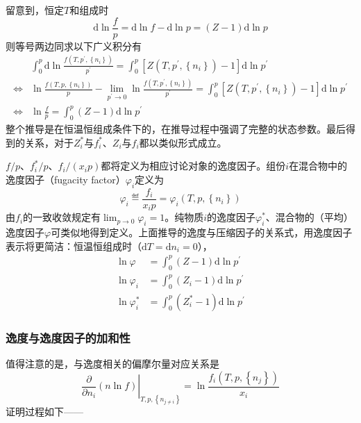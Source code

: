 \documentclass[main.tex]{subfiles}
\begin{document}
留意到，恒定$T$和组成时
\[\mathrm{d}\ln\frac{f}{p}=\mathrm{d}\ln f-\mathrm{d}\ln p=\left(Z-1\right)\mathrm{d}\ln p\]
则等号两边同求以下广义积分有
\begin{align*}
                    & \int_0^p\mathrm{d}\ln\frac{f\left(T,p^\prime,\left\{n_i\right\}\right)}{p^\prime}=\int_0^p\left[Z\left(T,p^\prime,\left\{n_i\right\}\right)-1\right]\mathrm{d}\ln p^\prime                                                     \\
    \Leftrightarrow & \ln\frac{f\left(T,p,\left\{n_i\right\}\right)}{p}-\lim_{p^\prime\to 0}\ln\frac{f\left(T,p^\prime,\left\{n_i\right\}\right)}{p^\prime}=\int_0^p\left[Z\left(T,p^\prime,\left\{n_i\right\}\right)-1\right]\mathrm{d}\ln p^\prime \\
    \Leftrightarrow & \ln\frac{f}{p}=\int_0^p\left(Z-1\right)\mathrm{d}\ln p^\prime
\end{align*}
整个推导是在恒温恒组成条件下的，在推导过程中强调了完整的状态参数。最后得到的关系，对于$Z_i^*$与$f_i^*$、$Z_i$与$f_i$都以类似形式成立。

$f/p$、$f_i^*/p$、$f_i/\left(x_ip\right)$都将定义为相应讨论对象的逸度因子。组份$i$在混合物中的逸度因子（fugacity factor）$\varphi_i$定义为
\begin{equation}\label{eq:II.4_def_fugacity_factor_i}
    \varphi_i\eqdef\frac{f_i}{x_ip}=\varphi_i\left(T,p,\left\{n_i\right\}\right)
\end{equation}
由$f_i$的一致收敛规定有$\lim_{p\to 0}\varphi_i=1$。纯物质$i$的逸度因子$\varphi_i^*$、混合物的（平均）逸度因子$\varphi$可类似地得到定义。上面推导的逸度与压缩因子的关系式，用逸度因子表示将更简洁：恒温恒组成时（$\mathrm{d}T=\mathrm{d}n_i=0$），
\begin{align*}
    \ln\varphi     & =\int_0^p\left(Z-1\right)\mathrm{d}\ln p^\prime     \\
    \ln\varphi_i   & =\int_0^p\left(Z_i-1\right)\mathrm{d}\ln p^\prime   \\
    \ln\varphi^*_i & =\int_0^p\left(Z_i^*-1\right)\mathrm{d}\ln p^\prime
\end{align*}

\subsubsection{逸度与逸度因子的加和性}
值得注意的是，与逸度相关的偏摩尔量对应关系是
\[\left.\frac{\partial}{\partial n_i}\left(n\ln f\right)\right|_{T,p,\left\{n_{j\neq i}\right\}}=\ln\frac{f_i\left(T,p,\left\{n_j\right\}\right)}{x_i}\]
证明过程如下——
\end{document}
